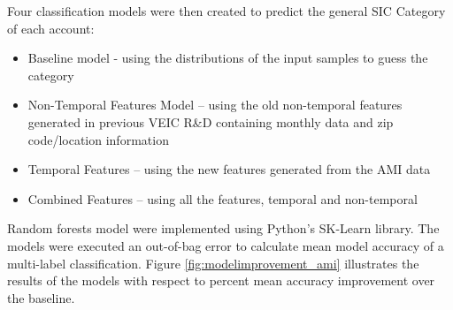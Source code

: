 Four classification models were then created to predict the general SIC Category of each account:
\begin{itemize}
\item Baseline model - using the distributions of the input samples to guess the category
\item Non-Temporal Features Model – using the old non-temporal features generated in previous VEIC R&D containing monthly data and zip code/location information
\item Temporal Features – using the new features generated from the AMI data
\item Combined Features – using all the features, temporal and non-temporal
\end{itemize}

Random forests model were implemented using Python’s SK-Learn library. The models were executed an out-of-bag error to calculate mean model accuracy of a multi-label classification. Figure \ref{fig:modelimprovement_ami} illustrates the results of the models with respect to percent mean accuracy improvement over the baseline.
